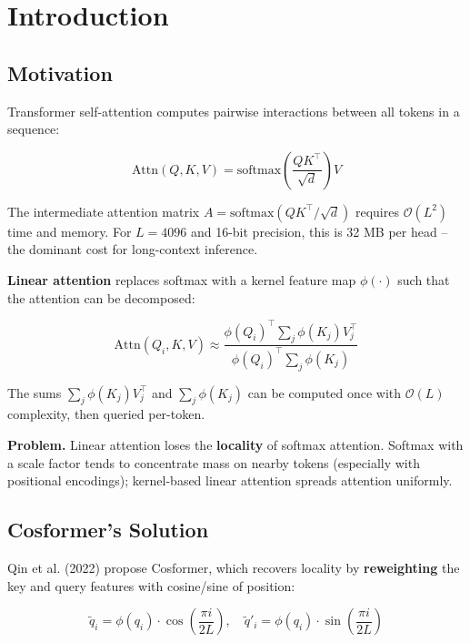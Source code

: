 
\section{Introduction}

\subsection{Motivation}

Transformer self-attention computes pairwise interactions between all tokens 
in a sequence:

\begin{equation}
\text{Attn}(Q, K, V) = \text{softmax}\!\left(\frac{QK^\top}{\sqrt{d}}\right)V
\end{equation}

The intermediate attention matrix $A = \text{softmax}(QK^\top / \sqrt{d})$ 
requires $\mathcal{O}(L^2)$ time and memory. For $L = 4096$ and 16-bit 
precision, this is 32 MB per head -- the dominant cost for long-context 
inference.

\textbf{Linear attention} replaces softmax with a kernel feature map 
$\phi(\cdot)$ such that the attention can be decomposed:

\begin{equation}
\text{Attn}(Q_i, K, V) \approx \frac{\phi(Q_i)^\top \sum_j \phi(K_j) V_j^\top}{\phi(Q_i)^\top \sum_j \phi(K_j)}
\end{equation}

The sums $\sum_j \phi(K_j) V_j^\top$ and $\sum_j \phi(K_j)$ can be computed 
once with $\mathcal{O}(L)$ complexity, then queried per-token.

\textbf{Problem.} Linear attention loses the \textbf{locality} of softmax attention. 
Softmax with a scale factor tends to concentrate mass on nearby tokens 
(especially with positional encodings); kernel-based linear attention 
spreads attention uniformly.

\subsection{Cosformer's Solution}

Qin et al. (2022) propose Cosformer, which recovers locality by 
\textbf{reweighting} the key and query features with cosine/sine of position:

\begin{equation}
\tilde{q}_i = \phi(q_i) \cdot \cos\!\left(\frac{\pi i}{2 L}\right), \quad
\tilde{q}'_i = \phi(q_i) \cdot \sin\!\left(\frac{\pi i}{2 L}\right)
\end{equation}

